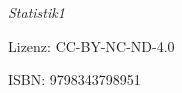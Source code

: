 \null\vfill
\begin{flushleft}
\thispagestyle{empty}
\textit{Statistik1}

Lizenz: CC-BY-NC-ND-4.0

ISBN: 9798343798951



\end{flushleft}
